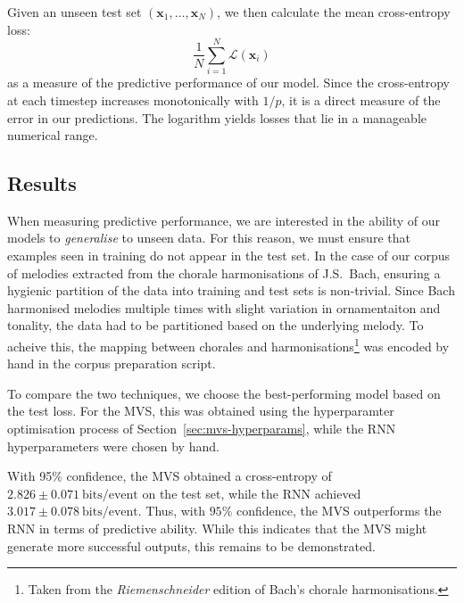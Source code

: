 \documentclass[12pt,a4paper,twoside,openright]{report}
\newcommand{\vect}[1]{\boldsymbol{\mathbf{#1}}}
\begin{document}
Given an unseen test set $(\vect{x}_1,\ldots,\vect{x}_N)$, we then calculate the
mean cross-entropy loss:
$$ \frac{1}{N}\sum_{i = 1}^N \mathcal{L}(\vect{x}_i) $$
as a measure of the predictive performance of our model. Since the cross-entropy
at each timestep increases monotonically with $1/p$, it is a direct measure of
the error in our predictions. The logarithm yields losses that lie in a
manageable numerical range.

\subsection{Results}

When measuring predictive performance, we are interested in the ability of our
models to \emph{generalise} to unseen data. For this reason, we must ensure that
examples seen in training do not appear in the test set. In the case of our
corpus of melodies extracted from the chorale harmonisations of J.S.\ Bach,
ensuring a hygienic partition of the data into training and test sets is
non-trivial. Since Bach harmonised melodies multiple times with slight variation
in ornamentaiton and tonality, the data had to be partitioned based on the
underlying melody. To acheive this, the mapping between chorales and
harmonisations\footnote{Taken from the \emph{Riemenschneider} edition of Bach's
chorale harmonisations.} was encoded by hand in the corpus preparation script.

To compare the two techniques, we choose the best-performing model based on the
test loss. For the MVS, this was obtained using the hyperparamter optimisation
process of Section~\ref{sec:mvs-hyperparams}, while the RNN hyperparameters were
chosen by hand. 

With 95\% confidence, the MVS obtained a cross-entropy of $2.826 \pm 0.071\
\mathrm{bits}/\mathrm{event}$ on the test set, while the RNN achieved $3.017 \pm
0.078\ \mathrm{bits}/\mathrm{event}$. Thus, with $95\%$ confidence, the MVS
outperforms the RNN in terms of predictive ability. While this indicates that
the MVS might generate more successful outputs, this remains to be demonstrated.
\end{document}
